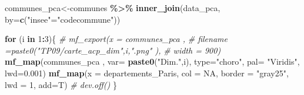 \documentclass[
]{book}
\newenvironment{Shaded}{\begin{snugshade}}{\end{snugshade}}
\newcommand{\AttributeTok}[1]{\textcolor[rgb]{0.13,0.29,0.53}{#1}}
\newcommand{\CommentTok}[1]{\textcolor[rgb]{0.56,0.35,0.01}{\textit{#1}}}
\newcommand{\ConstantTok}[1]{\textcolor[rgb]{0.56,0.35,0.01}{#1}}
\newcommand{\ControlFlowTok}[1]{\textcolor[rgb]{0.13,0.29,0.53}{\textbf{#1}}}
\newcommand{\DecValTok}[1]{\textcolor[rgb]{0.00,0.00,0.81}{#1}}
\newcommand{\FloatTok}[1]{\textcolor[rgb]{0.00,0.00,0.81}{#1}}
\newcommand{\FunctionTok}[1]{\textcolor[rgb]{0.13,0.29,0.53}{\textbf{#1}}}
\newcommand{\NormalTok}[1]{#1}
\newcommand{\OtherTok}[1]{\textcolor[rgb]{0.56,0.35,0.01}{#1}}
\newcommand{\SpecialCharTok}[1]{\textcolor[rgb]{0.81,0.36,0.00}{\textbf{#1}}}
\newcommand{\StringTok}[1]{\textcolor[rgb]{0.31,0.60,0.02}{#1}}
\begin{document}
\begin{Shaded}
\begin{Highlighting}[]
\NormalTok{communes\_pca}\OtherTok{\textless{}{-}}\NormalTok{communes }\SpecialCharTok{\%\textgreater{}\%}
  \FunctionTok{inner\_join}\NormalTok{(data\_pca, }\AttributeTok{by=}\FunctionTok{c}\NormalTok{(}\StringTok{"insee"}\OtherTok{=}\StringTok{"codecommune"}\NormalTok{))}


\ControlFlowTok{for}\NormalTok{ (i }\ControlFlowTok{in} \DecValTok{1}\SpecialCharTok{:}\DecValTok{3}\NormalTok{)\{}
  \CommentTok{\# mf\_export(x = communes\_pca ,}
  \CommentTok{\#           filename =paste0("TP09/carte\_acp\_dim",i,".png" ),}
  \CommentTok{\#           width = 900)}
  \FunctionTok{mf\_map}\NormalTok{(communes\_pca ,}
         \AttributeTok{var=} \FunctionTok{paste0}\NormalTok{(}\StringTok{"Dim."}\NormalTok{,i),}
         \AttributeTok{type=}\StringTok{"choro"}\NormalTok{,}
         \AttributeTok{pal=} \StringTok{"Viridis"}\NormalTok{,}
         \AttributeTok{lwd=}\FloatTok{0.001}\NormalTok{)}
  \FunctionTok{mf\_map}\NormalTok{(}\AttributeTok{x =}\NormalTok{ departements\_Paris, }\AttributeTok{col =} \ConstantTok{NA}\NormalTok{, }\AttributeTok{border =} \StringTok{"gray25"}\NormalTok{, }\AttributeTok{lwd =} \DecValTok{1}\NormalTok{, }\AttributeTok{add=}\NormalTok{T)}
  \CommentTok{\# dev.off()}
\NormalTok{\}}
\end{Highlighting}
\end{Shaded}
\end{document}
